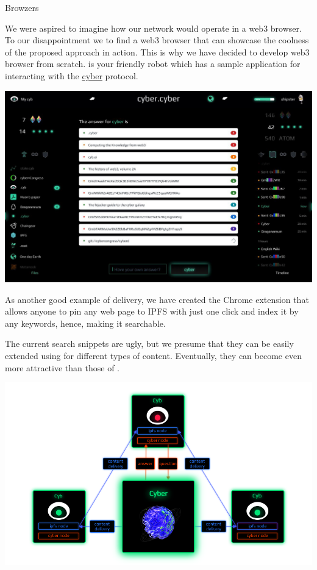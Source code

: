 \documentclass[8pt,oneside]{amsart}
\makeatletter
\newcommand{\linkred}[2]{\href{#1}{\color{red}{#2}}}
\renewcommand\subsection{\@startsection{subsection}
                                    {2}{\z@}
                                    {-3.25ex\@plus -1ex \@minus -.2ex}
                                    {0ex \@plus .2ex}
                                    {\play\Large}
                        }
\newcommand{\titleSection}[1]{\subsection{#1}}
\newenvironment{Figure}
  {\par\medskip\noindent\minipage{\linewidth}}
  {\endminipage\par\medskip}
\makeatother
\begin{document}
\titleSection{Browzers}\label{browzers}

We were aspired to imagine how our network would operate in a web3 browser. To our disappointment we \linkred{https://github.com/cybercongress/cyb/blob/master/docs/comparison.md}{were not able} to find a web3 browser that can showcase the coolness of the proposed approach in action. This is why we have decided to develop web3 browser from scratch. \linkred{https://cyb.ai}{Cyb} is your friendly robot which has a sample \linkred{https://cyber.page}{.cyber} application for interacting with the {\hyperref[cyber]{cyber}} protocol.

\begin{Figure}
  \medskip
  \centering
  \includegraphics[width=1\textwidth]{cyb.jpg}
  \medskip
\end{Figure}

As another good example of delivery, we have created the Chrome extension \linkred{https://github.com/cybercongress/cyb-virus}{cyb-virus} that allows anyone to pin any web page to IPFS with just one click and index it by any keywords, hence, making it searchable.

The current search snippets are ugly, but we presume that they can be easily extended using \linkred{https://github.com/ipld/specs}{IPLD} for different types of content. Eventually, they can become even more attractive than those of \linkred{https://google.com}{Google}.

\begin{Figure}
    \centering
    \includegraphics[width=1\textwidth]{architecture.png}
\end{Figure}
\end{document}
